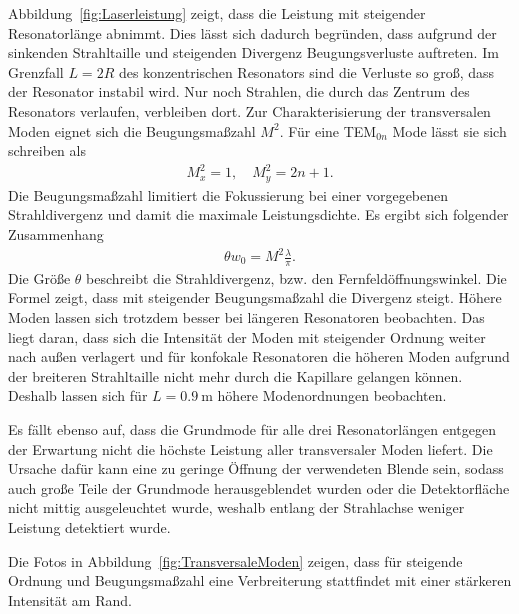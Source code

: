 \documentclass[a4paper,twoside,final]{article}
\begin{document}
Abbildung~\ref{fig:Laserleistung} zeigt, dass die Leistung mit steigender Resonatorlänge abnimmt. Dies lässt sich dadurch begründen, dass aufgrund der sinkenden Strahltaille und steigenden Divergenz Beugungsverluste auftreten. Im Grenzfall $L = 2R$ des konzentrischen Resonators sind die Verluste so groß, dass der Resonator instabil wird. Nur noch Strahlen, die durch das Zentrum des Resonators verlaufen, verbleiben dort. Zur Charakterisierung der transversalen Moden eignet sich die Beugungsmaßzahl $M^2$. Für eine TEM$_{0n}$ Mode lässt sie sich schreiben als~\cite{Eichler_strahlqualitaet}
\begin{align}
  M_x^2 = 1, \quad M_y^2 = 2n +1.
\end{align}
Die Beugungsmaßzahl limitiert die Fokussierung bei einer vorgegebenen Strahldivergenz und damit die maximale Leistungsdichte. Es ergibt sich folgender Zusammenhang~\cite{Sigrist}
\begin{align}
  \theta w_0 = M^2 \frac{\lambda}{\pi}.
\end{align}
Die Größe $\theta$ beschreibt die Strahldivergenz, bzw. den Fernfeldöffnungswinkel. Die Formel zeigt, dass mit steigender Beugungsmaßzahl die Divergenz steigt. Höhere Moden lassen sich trotzdem besser bei längeren Resonatoren beobachten. Das liegt daran, dass sich die Intensität der Moden mit steigender Ordnung weiter nach außen verlagert und für konfokale Resonatoren die höheren Moden aufgrund der breiteren Strahltaille nicht mehr durch die Kapillare gelangen können. Deshalb lassen sich für $L=\SI{0.9}{\metre}$ höhere Modenordnungen beobachten.

Es fällt ebenso auf, dass die Grundmode für alle drei Resonatorlängen entgegen der Erwartung nicht die höchste Leistung aller transversaler Moden liefert. Die Ursache dafür kann eine zu geringe Öffnung der verwendeten Blende sein, sodass auch große Teile der Grundmode herausgeblendet wurden oder die Detektorfläche nicht mittig ausgeleuchtet wurde, weshalb entlang der Strahlachse weniger Leistung detektiert wurde.

Die Fotos in Abbildung~\ref{fig:TransversaleModen} zeigen, dass für steigende Ordnung und Beugungsmaßzahl eine Verbreiterung stattfindet mit einer stärkeren Intensität am Rand.
\end{document}
